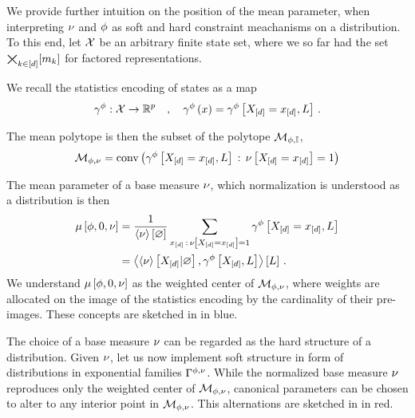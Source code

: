 
We provide further intuition on the position of the mean parameter, when interpreting $\nu$ and $\phi$ as soft and hard constraint meachanisms on a distribution.
To this end, let $\mathcal{X}$ be an arbitrary finite state set, where we so far had the set $\bigtimes_{k\in[d]}[m_{k}]$ for factored representations.

We recall the statistics encoding of states as a map
\begin{align*}
    \gamma^{\phi} : \mathcal{X} \rightarrow \mathbb{R}^{p} \quad, \quad
    \gamma^{\phi}\left(x\right) = \gamma^{\phi}\left[X_{[d]}=x_{[d]},L\right] \, .
\end{align*}

%
The mean polytope is then the subset of the polytope $\mathcal{M}_{\phi,\mathbb{I}}$,
\begin{align*}
    \mathcal{M}_{\phi,\nu}
    = \mathrm{conv}\left(\gamma^{\phi}\left[X_{[d]}=x_{[d]},L\right]\,:\,\nu\left[X_{[d]}=x_{[d]}\right]=1\right)
\end{align*}

The mean parameter of a base measure $\nu$, which normalization is understood as a distribution is then
\begin{align*}
    \mu\left[\phi,0,\nu\right]
    &= \frac{1}{\left\langle \nu\right\rangle \left[ \varnothing \right]} \sum_{x_{[d]}\,:\,\nu\left[X_{[d]}=x_{[d]}\right]=1}  \gamma^{\phi}\left[X_{[d]}=x_{[d]},L\right] \\
    &= \left\langle \left\langle \nu\right\rangle \left[ X_{[d]} | \varnothing \right],\gamma^{\phi}\left[X_{[d]},L\right]\right\rangle \left[ L \right] \, .
\end{align*}
We understand $\mu\left[\phi,0,\nu\right]$ as the weighted center of $\mathcal{M}_{\phi,\nu}$, where weights are allocated on the image of the statistics encoding by the cardinality of their pre-images.
These concepts are sketched in  in blue.

The choice of a base measure $\nu$ can be regarded as the hard structure of a distribution.
Given $\nu$, let us now implement soft structure in form of distributions in exponential families $\Gamma^{\phi,\nu}$.
While the normalized base measure $\nu$ reproduces only the weighted center of $\mathcal{M}_{\phi,\nu}$, canonical parameters can be chosen to alter to any interior point in $\mathcal{M}_{\phi,\nu}$. %
This alternations are sketched in  in red.

